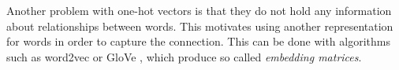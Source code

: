 \\\\
Another problem with one-hot vectors is that they do not hold any information about relationships between words. This motivates using another representation for words in order to capture the connection. This can be done with algorithms such as word2vec \parencite{mikolov2013linguistic} or GloVe \parencite{pennington2014glove}, which produce so called \textit{embedding matrices}.